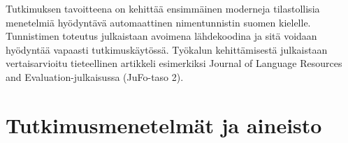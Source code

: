 \documentclass[12pt,a4paper,finnish,oneside]{article}
\begin{document}


Tutkimuksen tavoitteena on kehittää ensimmäinen moderneja tilastollisia menetelmiä hyödyntävä automaattinen nimentunnistin suomen kielelle. Tunnistimen toteutus julkaistaan avoimena lähdekoodina ja sitä voidaan hyödyntää vapaasti tutkimuskäytössä. Työkalun kehittämisestä julkaistaan vertaisarvioitu tieteellinen artikkeli esimerkiksi Journal of Language Resources and Evaluation-julkaisussa (JuFo-taso 2).


\section{Tutkimusmenetelmät ja aineisto}


\end{document}
